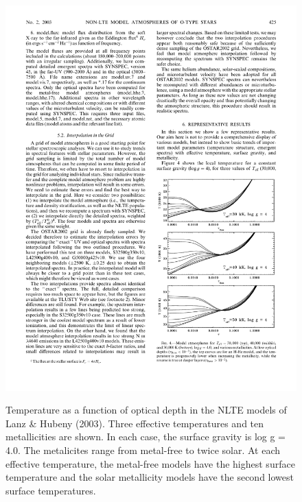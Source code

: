 \begin{figure}
\includegraphics[width=\linewidth]{figures/lanz-hubeny-temperature.pdf}
\label{figure:lanz-hubeny-temperature}
\caption{Temperature as a function of optical depth in the NLTE models of Lanz \& Hubeny (2003). Three effective temperatures and ten metallicities are shown. In each case, the surface gravity is log g = 4.0. The metalicites range from metal-free to twice solar. At each effective temperature, the metal-free models have the highest surface temperature and the solar metallicity models have  the second lowest surface temperatures.}
\end{figure}

